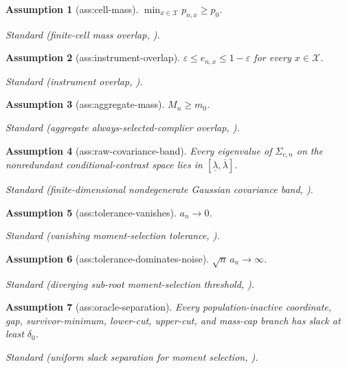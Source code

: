 \documentclass{article}
\newtheorem{assumption}{Assumption}
\begin{document}
\begin{assumption}[ass:cell-mass]\label{ass:cell-mass}
\(\min_{x\in\mathcal X}p_{n,x}\ge p_0\).
\par\smallskip\noindent\emph{Standard} (finite-cell mass overlap, \cite{ChernozhukovLeeRosen2013}).
\end{assumption}

\begin{assumption}[ass:instrument-overlap]\label{ass:instrument-overlap}
\(\varepsilon\le e_{n,x}\le1-\varepsilon\) for every \(x\in\mathcal X\).
\par\smallskip\noindent\emph{Standard} (instrument overlap, \cite{DongHeiler2026}).
\end{assumption}

\begin{assumption}[ass:aggregate-mass]\label{ass:aggregate-mass}
\(M_n\ge m_0\).
\par\smallskip\noindent\emph{Standard} (aggregate always-selected-complier overlap, \cite{DongHeiler2026}).
\end{assumption}

\begin{assumption}[ass:raw-covariance-band]\label{ass:raw-covariance-band}
Every eigenvalue of \(\Sigma_{c,n}\) on the nonredundant conditional-contrast space lies in \([\underline\lambda,\overline\lambda]\).
\par\smallskip\noindent\emph{Standard} (finite-dimensional nondegenerate Gaussian covariance band, \cite{ChernozhukovChetverikovKato2017}).
\end{assumption}

\begin{assumption}[ass:tolerance-vanishes]\label{ass:tolerance-vanishes}
\(a_n\to0\).
\par\smallskip\noindent\emph{Standard} (vanishing moment-selection tolerance, \cite{AndrewsSoares2010}).
\end{assumption}

\begin{assumption}[ass:tolerance-dominates-noise]\label{ass:tolerance-dominates-noise}
\(\sqrt n\,a_n\to\infty\).
\par\smallskip\noindent\emph{Standard} (diverging sub-root moment-selection threshold, \cite{AndrewsSoares2010}).
\end{assumption}

\begin{assumption}[ass:oracle-separation]\label{ass:oracle-separation}
Every population-inactive coordinate, gap, survivor-minimum, lower-cut, upper-cut, and mass-cap branch has slack at least \(\delta_0\).
\par\smallskip\noindent\emph{Standard} (uniform slack separation for moment selection, \cite{AndrewsBarwick2012}).
\end{assumption}
\end{document}
